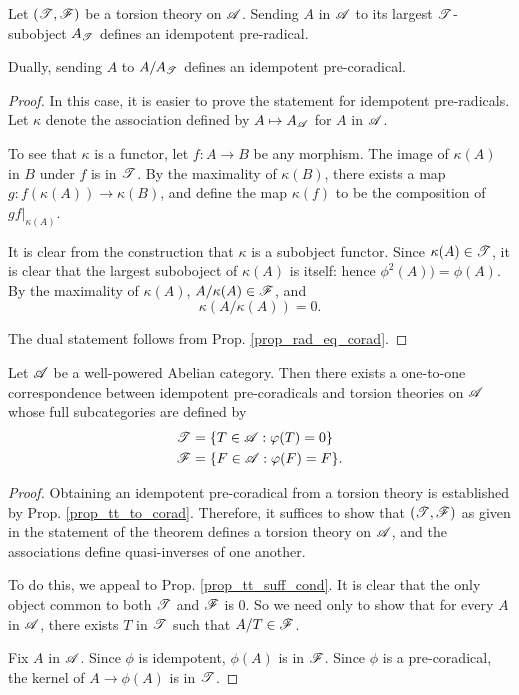 \begin{prop}\label{prop_tt_to_corad}
Let $(\mathscr{T}, \mathscr{F})$ be a torsion theory on $\mathscr{A}$. 
Sending $A$ in $\mathscr{A}$ to its largest $\mathscr{T}$-subobject 
$A_{\mathscr{T}}$ defines an idempotent pre-radical.

Dually, sending $A$ to $A/A_{\mathscr{T}}$ defines an idempotent 
pre-coradical.
\end{prop}
\begin{proof}
In this case, it is easier to prove the statement for idempotent 
pre-radicals. Let $\kappa$ denote the association defined by $A 
\mapsto A_{\mathscr{A}}$ for $A$ in $\mathscr{A}$.

To see that $\kappa$ is a functor, let $f: A \to B$ be any 
morphism. The image of $\kappa(A)$ in $B$ under $f$ is in 
$\mathscr{T}$. By the maximality of $\kappa(B)$, there exists a map 
$g: f(\kappa(A)) \to \kappa(B)$, and define the map $\kappa(f)$ 
to be the composition of $g f|_{\kappa(A)}$.

It is clear from the construction that $\kappa$ is a subobject 
functor. Since $\kappa(A) \in \mathscr{T}$, it is clear that the 
largest suboboject of $\kappa(A)$ is itself: hence $\phi^2(A)) = 
\phi(A)$. By the maximality of $\kappa(A)$, $A/\kappa(A) \in 
\mathscr{F}$, and 
\[
\kappa(A/\kappa(A)) = 0.
\]

The dual statement follows from Prop. \ref{prop_rad_eq_corad}.
\end{proof}

\begin{thm}\label{thm_precorad_eq_tt}
Let $\mathscr{A}$ be a well-powered Abelian category. Then there exists
a one-to-one correspondence between idempotent pre-coradicals and
torsion theories on $\mathscr{A}$ whose full subcategories are defined 
by
\begin{align*}
\mathscr{T} &= \{ T \in \mathscr{A} : \varphi(T) = 0 \} \\
\mathscr{F} &= \{ F \in \mathscr{A} : \varphi(F) = F \}.
\end{align*}
\end{thm}
\begin{proof}
Obtaining an idempotent pre-coradical from a torsion theory is
established by Prop. \ref{prop_tt_to_corad}. Therefore, it suffices
to show that $(\mathscr{T}, \mathscr{F})$ as given in the statement of the
theorem defines a torsion theory on $\mathscr{A}$, and the associations
define quasi-inverses of one another.

To do this, we appeal to Prop. \ref{prop_tt_suff_cond}. It is 
clear that the only object common to both $\mathscr{T}$
and $\mathscr{F}$ is $0$. So we need only to show that for every $A$ 
in $\mathscr{A}$, there exists $T$ in $\mathscr{T}$ such that $A/T \in 
\mathscr{F}$.

Fix $A$ in $\mathscr{A}$. Since $\phi$ is idempotent, $\phi(A)$ is 
in $\mathscr{F}$. Since $\phi$ is a pre-coradical, the kernel of $A
\to \phi(A)$ is in $\mathscr{T}$.
\end{proof}

